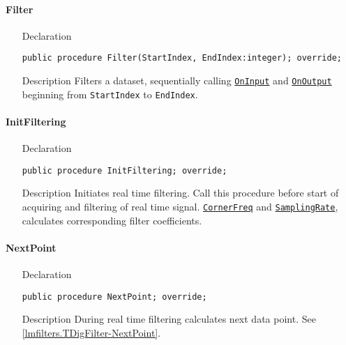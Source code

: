 \documentclass[12pt,a4paper,oneside]{report}
\newcommand{\declarationitem}[1]{{\addfontfeatures{FakeSlant} #1}}
\newcommand{\descriptiontitle}[1]{{\addfontfeatures{FakeSlant}#1}}
\newcommand{\code}[1]{\texttt{#1}}
\begin{document}
\paragraph{Filter}\hspace*{\fill}
\label{lmRecursFilters.THighPassFilter-Filter}
\begin{itemize}\item[\declarationitem{Declaration}\hfill]
	\begin{flushleft}
		\code{public procedure Filter(StartIndex, EndIndex:integer); override;}
	\end{flushleft}
\item[\descriptiontitle{Description}] Filters a dataset, sequentially calling \hyperref[lmfilters.TDigFilter-OnInput]{\code{OnInput}} and \hyperref[lmfilters.TDigFilter-OnOutput]{\code{OnOutput}} beginning from \code{StartIndex} to \code{EndIndex}.
\end{itemize}
\paragraph{InitFiltering}\hspace*{\fill}
\label{lmRecursFilters.THighPassFilter-InitFiltering}
\begin{itemize}\item[\declarationitem{Declaration}\hfill]
	\begin{flushleft}
			\code{public procedure InitFiltering; override;}
	\end{flushleft}
\item[\descriptiontitle{Description}] Initiates real time filtering. Call this procedure before start of acquiring and filtering of real time signal. \hyperref[lmfilters.TOneFreqFilter-Cutfreq1]{\code{CornerFreq}}  and \hyperref[lmfilters.TOneFreqFilter-SamplingRate]{\code{SamplingRate}}, calculates corresponding filter coefficients. \end{itemize}
\paragraph{NextPoint}
\label{lmRecursFilters.THighPassFilter-NextPoint}
\begin{itemize}\item[\declarationitem{Declaration}\hfill]
	\begin{flushleft}
			\code{public procedure NextPoint; override;}
	\end{flushleft}
\item[\descriptiontitle{Description}] 
During real time filtering calculates next data point. See \ref{lmfilters.TDigFilter-NextPoint}.
\end{itemize}
\end{document}
